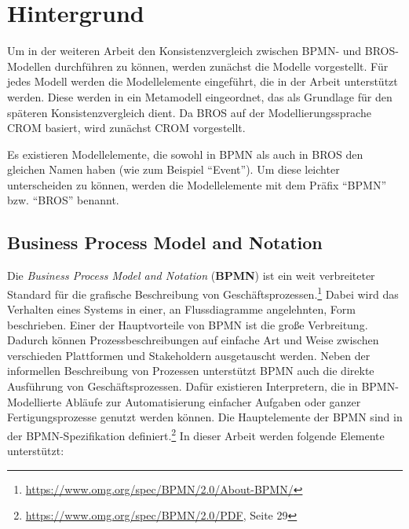 \chapter{Hintergrund}
\label{chap:background}

Um in der weiteren Arbeit den Konsistenzvergleich zwischen BPMN- und BROS-Modellen durchführen zu können, werden zunächst die Modelle vorgestellt.
Für jedes Modell werden die Modellelemente eingeführt, die in der Arbeit unterstützt werden.
Diese werden in ein Metamodell eingeordnet, das als Grundlage für den späteren Konsistenzvergleich dient.
Da BROS auf der Modellierungssprache CROM basiert, wird zunächst CROM vorgestellt.

Es existieren Modellelemente, die sowohl in BPMN als auch in BROS den gleichen Namen haben (wie zum Beispiel ``Event'').
Um diese leichter unterscheiden zu können, werden die Modellelemente mit dem Präfix ``BPMN'' bzw. ``BROS'' benannt.

\section{Business Process Model and Notation}

Die \emph{Business Process Model and Notation} (\textbf{BPMN}) ist ein weit verbreiteter Standard für die grafische Beschreibung von Geschäftsprozessen.\footnote{\url{https://www.omg.org/spec/BPMN/2.0/About-BPMN/}}
Dabei wird das Verhalten eines Systems in einer, an Flussdiagramme angelehnten, Form beschrieben.
Einer der Hauptvorteile von BPMN ist die große Verbreitung.
Dadurch können Prozessbeschreibungen auf einfache Art und Weise zwischen verschieden Plattformen und Stakeholdern ausgetauscht werden.
Neben der informellen Beschreibung von Prozessen unterstützt BPMN auch die direkte Ausführung von Geschäftsprozessen.
Dafür existieren Interpretern, die in BPMN-Modellierte Abläufe zur Automatisierung einfacher Aufgaben oder ganzer Fertigungsprozesse genutzt werden können.
Die Hauptelemente der BPMN sind in der BPMN-Spezifikation definiert.\footnote{\url{https://www.omg.org/spec/BPMN/2.0/PDF}, Seite 29}
In dieser Arbeit werden folgende Elemente unterstützt:

